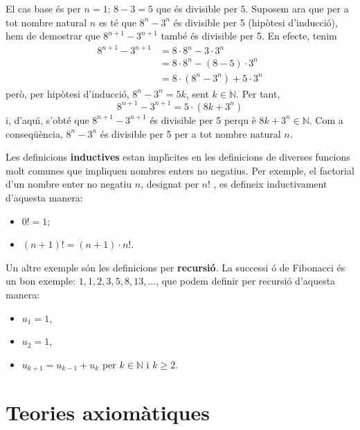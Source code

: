 \begin{solucio}
El cas base \'{e}s per $n=1$: $8-3=5$ que \'{e}s divisible per $5$. Suposem
ara que per a tot nombre natural $n$ es t\'{e} que $8^{n}-3^{n}$ \'{e}s
divisible per 5 (hip\`{o}tesi d'inducci\'{o}), hem de demostrar que $%
8^{n+1}-3^{n+1}$ tamb\'{e} \'{e}s divisible per 5. En efecte, tenim%
\begin{align*}
8^{n+1}-3^{n+1} & =8\cdot8^{n}-3\cdot3^{n} \\
& =8\cdot8^{n}-\left( 8-5\right) \cdot3^{n} \\
& =8\cdot\left( 8^{n}-3^{n}\right) +5\cdot3^{n}
\end{align*}
per\`{o}, per hip\`{o}tesi d'inducci\'{o}, $8^{n}-3^{n}=5k$, sent $k\in%
\mathbb{N}$. Per tant,%
\begin{equation*}
8^{n+1}-3^{n+1}=5\cdot\left( 8k+3^{n}\right)
\end{equation*}
i, d'aqu\'{\i}, s'obt\'{e} que $8^{n+1}-3^{n+1}$ \'{e}s divisible per 5 perqu%
\`{e} $8k+3^{n}\in\mathbb{N}$. Com a conseq\"{u}\`{e}ncia, $8^{n}-3^{n}$
\'{e}s divisible per 5 per a tot nombre natural $n$.
\end{solucio}

Les definicions \textbf{inductives} estan impl\'{\i}cites en les definicions
de diverses funcions molt comunes que impliquen nombres enters no negatius.
Per exemple, el factorial d'un nombre enter no negatiu $n$, designat per $n!$%
, es defineix inductivament d'aquesta manera:

\begin{itemize}
\item $0!=1;$

\item $\left( n+1\right) !=\left( n+1\right) \cdot n!$.
\end{itemize}

Un altre exemple són les definicions per \textbf{recursi\'{o}}. La successi%
\'{o} de Fibonacci \'{e}s un bon exemple: $1,1,2,3,5,8,13,...$, que podem
definir per recursi\'{o} d'aquesta manera:

\begin{itemize}
\item $u_{1}=1$,

\item $u_{2}=1$,

\item $u_{k+1}=u_{k-1}+u_{k}$ per $k\in\mathbb{N}$ i $k\geq2$.
\end{itemize}

\section{Teories axiom\`{a}tiques}

